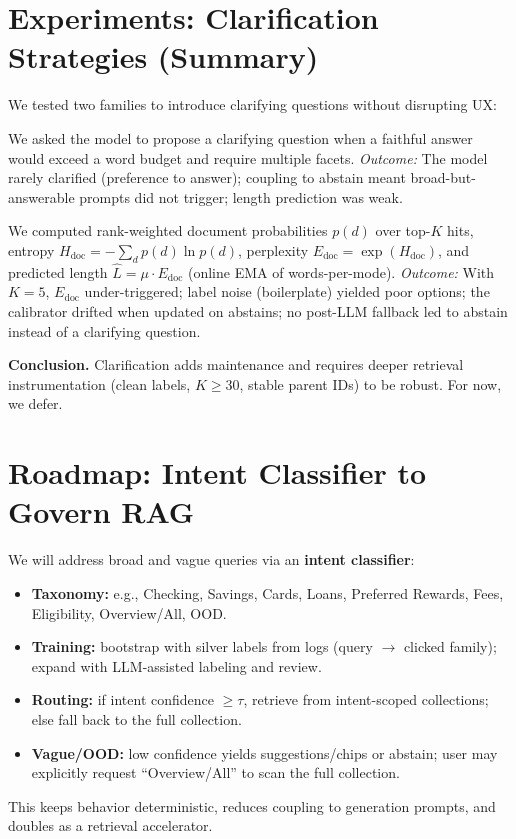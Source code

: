 \documentclass[11pt]{article}
\begin{document}
\section{Experiments: Clarification Strategies (Summary)}
We tested two families to introduce clarifying questions without disrupting UX:
\begin{description}[leftmargin=1.25em,labelindent=0em]
  \item[LLM policy in the prompt.] We asked the model to propose a clarifying question when a faithful answer would exceed a word budget and require multiple facets. \emph{Outcome:} The model rarely clarified (preference to answer); coupling to abstain meant broad-but-answerable prompts did not trigger; length prediction was weak.
  \item[Deterministic dispersion gate.] We computed rank-weighted document probabilities $p(d)$ over top-$K$ hits, entropy $H_{\text{doc}}=-\sum_d p(d)\ln p(d)$, perplexity $E_{\text{doc}}=\exp(H_{\text{doc}})$, and predicted length $\widehat{L}=\mu\cdot E_{\text{doc}}$ (online EMA of words-per-mode). \emph{Outcome:} With $K{=}5$, $E_{\text{doc}}$ under-triggered; label noise (boilerplate) yielded poor options; the calibrator drifted when updated on abstains; no post-LLM fallback led to abstain instead of a clarifying question.
\end{description}
\textbf{Conclusion.} Clarification adds maintenance and requires deeper retrieval instrumentation (clean labels, $K\ge 30$, stable parent IDs) to be robust. For now, we defer.

\section{Roadmap: Intent Classifier to Govern RAG}
We will address broad and vague queries via an \textbf{intent classifier}:
\begin{itemize}[leftmargin=1.25em]
  \item \textbf{Taxonomy:} e.g., Checking, Savings, Cards, Loans, Preferred Rewards, Fees, Eligibility, Overview/All, OOD.
  \item \textbf{Training:} bootstrap with silver labels from logs (query $\rightarrow$ clicked family); expand with LLM-assisted labeling and review.
  \item \textbf{Routing:} if intent confidence $\ge \tau$, retrieve from intent-scoped collections; else fall back to the full collection.
  \item \textbf{Vague/OOD:} low confidence yields suggestions/chips or abstain; user may explicitly request ``Overview/All'' to scan the full collection.
\end{itemize}
This keeps behavior deterministic, reduces coupling to generation prompts, and doubles as a retrieval accelerator.
\end{document}
